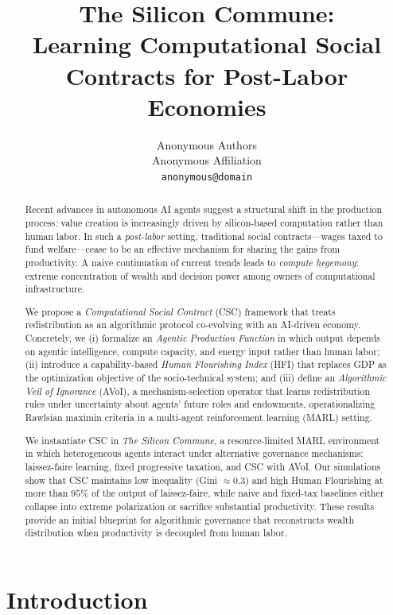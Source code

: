 \documentclass{article}
\title{The Silicon Commune:\\Learning Computational Social Contracts for Post-Labor Economies}
\author{%
  Anonymous Authors \\
  Anonymous Affiliation \\
  \texttt{anonymous@domain} \\
}
\begin{document}
\date{}

\maketitle

\begin{abstract}
Recent advances in autonomous AI agents suggest a structural shift in the production process: value creation is increasingly driven by silicon-based computation rather than human labor. In such a \emph{post-labor} setting, traditional social contracts---wages taxed to fund welfare---cease to be an effective mechanism for sharing the gains from productivity. A naive continuation of current trends leads to \emph{compute hegemony}: extreme concentration of wealth and decision power among owners of computational infrastructure.

We propose a \emph{Computational Social Contract} (CSC) framework that treats redistribution as an algorithmic protocol co-evolving with an AI-driven economy. Concretely, we (i) formalize an \emph{Agentic Production Function} in which output depends on agentic intelligence, compute capacity, and energy input rather than human labor; (ii) introduce a capability-based \emph{Human Flourishing Index} (HFI) that replaces GDP as the optimization objective of the socio-technical system; and (iii) define an \emph{Algorithmic Veil of Ignorance} (AVoI), a mechanism-selection operator that learns redistribution rules under uncertainty about agents' future roles and endowments, operationalizing Rawlsian maximin criteria in a multi-agent reinforcement learning (MARL) setting.

We instantiate CSC in \emph{The Silicon Commune}, a resource-limited MARL environment in which heterogeneous agents interact under alternative governance mechanisms: laissez-faire learning, fixed progressive taxation, and CSC with AVoI. Our simulations show that CSC maintains low inequality (Gini $\approx 0.3$) and high Human Flourishing at more than $95\%$ of the output of laissez-faire, while naive and fixed-tax baselines either collapse into extreme polarization or sacrifice substantial productivity. These results provide an initial blueprint for algorithmic governance that reconstructs wealth distribution when productivity is decoupled from human labor.
\end{abstract}

\section{Introduction}
\label{sec:intro}
\end{document}
